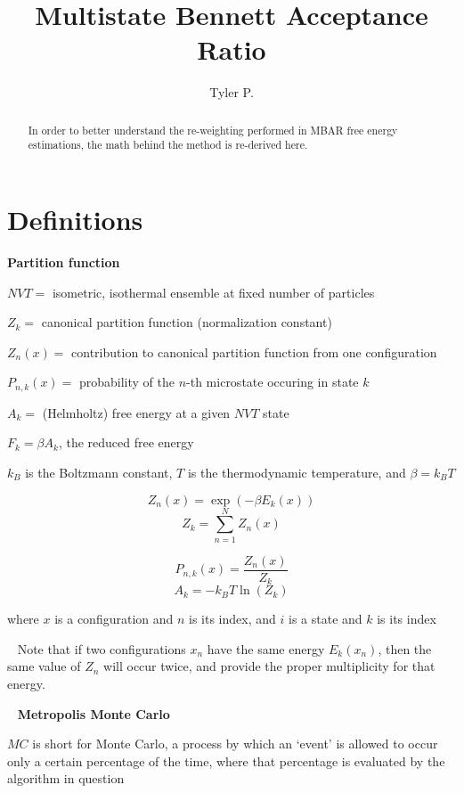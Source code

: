 \documentclass[]{article}
\title{Multistate Bennett Acceptance Ratio}
\author{Tyler P.}
\begin{document}
	
\maketitle

\begin{abstract}
	In order to better understand the re-weighting performed in MBAR free energy estimations, the math behind the method is re-derived here.
\end{abstract}

\section*{Definitions}
\textbf{Partition function}

$NVT =$ isometric, isothermal ensemble at fixed number of particles

$Z_k =$ canonical partition function (normalization constant)

$Z_n(x) =$ contribution to canonical partition function from one configuration

$P_{n,k}(x) =$ probability of the $n$-th microstate occuring in state $k$

$ A_k =$ (Helmholtz) free energy at a given $NVT$ state

$ F_k = \beta A_k$, the reduced free energy

$k_B$ is the Boltzmann constant, $T$ is the thermodynamic temperature, and $\beta = k_B T$

\begin{minipage}[b]{0.5\linewidth}
	\[ Z_n(x) = \exp(-\beta E_k(x)) \]
	\[ Z_k = \sum_{n=1}^{N} Z_n(x) \]
\end{minipage}
\begin{minipage}[b]{0.5\linewidth}
	\[ P_{n,k}(x) = \frac{Z_n(x)}{Z_k} \]
	\[ A_k = -k_B T \ln(Z_k) \]
\end{minipage}

where $x$ is a configuration and $n$ is its index,
and $i$ is a state and $k$ is its index

~\linebreak
Note that if two configurations $x_n$ have the same energy $E_k(x_n)$, then the same value of $Z_n$ will occur twice, and provide the proper multiplicity for that energy.

~\linebreak
\textbf{Metropolis Monte Carlo}\cite{bennett}

$MC$ is short for Monte Carlo, a process by which an `event' is allowed to occur only a certain percentage of the time, where that percentage is evaluated by the algorithm in question
\end{document}
